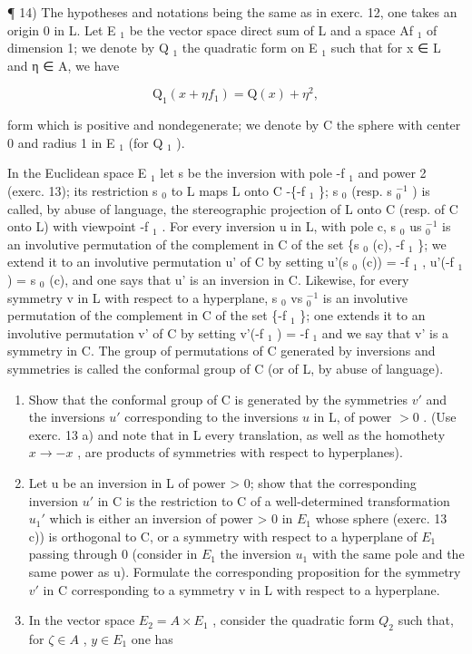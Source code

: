 ¶ 14) The hypotheses and notations being the same as in exerc. 12, one takes an origin 0 in L. Let E \(_{1}\) be the vector space direct sum of L and a space Af \(_{1}\) of dimension 1; we denote by Q \(_{1}\) the quadratic form on E \(_{1}\) such that for x ∈ L and η ∈ A, we have

\[
\mathrm{Q} _ {1} (x + \eta f _ {1}) = \mathrm{Q} (x) + \eta^ {2},
\]

form which is positive and nondegenerate; we denote by C the sphere with center 0 and radius 1 in E \(_{1}\) (for Q \(_{1}\) ).

In the Euclidean space E \(_{1}\) let s be the inversion with pole -f \(_{1}\) and power 2 (exerc. 13); its restriction s \(_{0}\) to L maps L onto C -\{-f \(_{1}\) \}; s \(_{0}\) (resp. s \(_{0}^{-1}\) ) is called, by abuse of language, the stereographic projection of L onto C (resp. of C onto L) with viewpoint -f \(_{1}\) . For every inversion u in L, with pole c, s \(_{0}\) us \(_{0}^{-1}\) is an involutive permutation of the complement in C of the set \{s \(_{0}\) (c), -f \(_{1}\) \}; we extend it to an involutive permutation u' of C by setting u'(s \(_{0}\) (c)) = -f \(_{1}\) , u'(-f \(_{1}\) ) = s \(_{0}\) (c), and one says that u' is an inversion in C. Likewise, for every symmetry v in L with respect to a hyperplane, s \(_{0}\) vs \(_{0}^{-1}\) is an involutive permutation of the complement in C of the set \{-f \(_{1}\) \}; one extends it to an involutive permutation v' of C by setting v'(-f \(_{1}\) ) = -f \(_{1}\) and we say that v' is a symmetry in C. The group of permutations of C generated by inversions and symmetries is called the conformal group of C (or of L, by abuse of language).

\begin{enumerate}
\def\labelenumi{\alph{enumi})}
\item
  Show that the conformal group of C is generated by the symmetries \(v'\) and the inversions \(u'\) corresponding to the inversions \(u\) in L, of power \(>0\) . (Use exerc. 13 a) and note that in L every translation, as well as the homothety \(x \to -x\) , are products of symmetries with respect to hyperplanes).
\item
  Let u be an inversion in L of power \textgreater{} 0; show that the corresponding inversion \(u'\) in C is the restriction to C of a well-determined transformation \(u_{1}'\) which is either an inversion of power \textgreater{} 0 in \(E_{1}\) whose sphere (exerc. 13 c)) is orthogonal to C, or a symmetry with respect to a hyperplane of \(E_{1}\) passing through 0 (consider in \(E_{1}\) the inversion \(u_{1}\) with the same pole and the same power as u). Formulate the corresponding proposition for the symmetry \(v'\) in C corresponding to a symmetry v in L with respect to a hyperplane.
\item
  In the vector space \(E_{2} = A \times E_{1}\) , consider the quadratic form \(Q_{2}\) such that, for \(\zeta \in A\) , \(y \in E_{1}\) one has
\end{enumerate}

